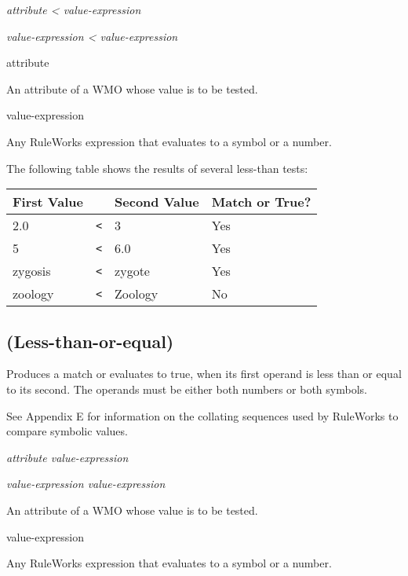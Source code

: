 \Format

\co{\^}\it{attribute} \co< \it{value-expression}

\it{value-expression} \co< \it{value-expression}

\begin{operands}
\item[\ct attribute]

  An attribute of a WMO whose value is to be tested.

\item[value-expression]

  Any RuleWorks expression that evaluates to a symbol or a number.
\end{operands}

\Example

The following table shows the results of several less-than tests:

\begin{center}
\begin{tabular}{lcll}
  \toprule
  First Value &   & Second Value & Match or True? \\
  \midrule
  2.0         & \verb|<| & 3            & Yes \\
  5           & \verb|<| & 6.0          & Yes \\
  zygosis     & \verb|<| & zygote       & Yes \\
  zoology     & \verb|<| & Zoology      & No \\
  \bottomrule
\end{tabular}
\end{center}

\subsection{\co{<=} (Less-than-or-equal)}

Produces a match or evaluates to true, when its first operand is less
than or equal to its second. The operands must be either both numbers
or both symbols.

See Appendix E for information on the collating sequences used by
RuleWorks to compare symbolic values.

\Format

\co{\^}\it{attribute} \co{<=} \it{value-expression}

\it{value-expression} \co{<=} \it{value-expression}

\begin{operands}
\item[\ct{attribute}]

  An attribute of a WMO whose value is to be tested.

\item[value-expression]

  Any RuleWorks expression that evaluates to a symbol or a number.
\end{operands}


